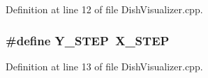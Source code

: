 \-Definition at line 12 of file \-Dish\-Visualizer.\-cpp.

\subsubsection[{\-Y\-\_\-\-S\-T\-E\-P}]{\setlength{\rightskip}{0pt plus 5cm}\#define {\bf \-Y\-\_\-\-S\-T\-E\-P}~{\bf \-X\-\_\-\-S\-T\-E\-P}}\label{DishVisualizer_8cpp_ae9e31004fb9430917b01ba9236799e4f}


\-Definition at line 13 of file \-Dish\-Visualizer.\-cpp.

